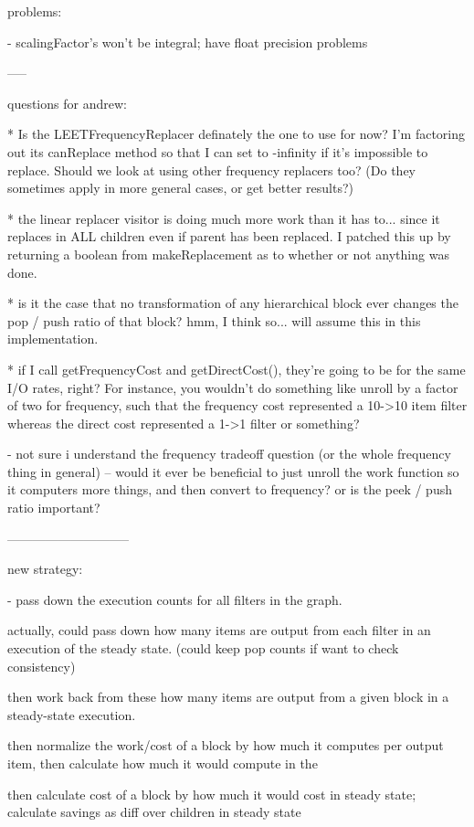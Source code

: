 problems:

- scalingFactor's won't be integral; have float precision problems

-----

questions for andrew:

* Is the LEETFrequencyReplacer definately the one to use for now?  I'm
  factoring out its canReplace method so that I can set to -infinity
  if it's impossible to replace.  Should we look at using other
  frequency replacers too?  (Do they sometimes apply in more general
  cases, or get better results?)

* the linear replacer visitor is doing much more work than it has
  to... since it replaces in ALL children even if parent has been
  replaced.  I patched this up by returning a boolean from
  makeReplacement as to whether or not anything was done.

* is it the case that no transformation of any hierarchical block ever
  changes the pop / push ratio of that block?  hmm, I think so... will
  assume this in this implementation.

* if I call getFrequencyCost and getDirectCost(), they're going to be
  for the same I/O rates, right?  For instance, you wouldn't do
  something like unroll by a factor of two for frequency, such that
  the frequency cost represented a 10->10 item filter whereas the
  direct cost represented a 1->1 filter or something?

- not sure i understand the frequency tradeoff question (or the whole
  frequency thing in general) -- would it ever be beneficial to just
  unroll the work function so it computers more things, and then
  convert to frequency?  or is the peek / push ratio important?

-----------------------------

new strategy:

- pass down the execution counts for all filters in the graph.  

  actually, could pass down how many items are output from each filter
  in an execution of the steady state.  (could keep pop counts if want
  to check consistency)

  then work back from these how many items are output from a given
  block in a steady-state execution.

  then normalize the work/cost of a block by how much it computes per
  output item, then calculate how much it would compute in the

  then calculate cost of a block by how much it would cost in steady
  state; calculate savings as diff over children in steady state

